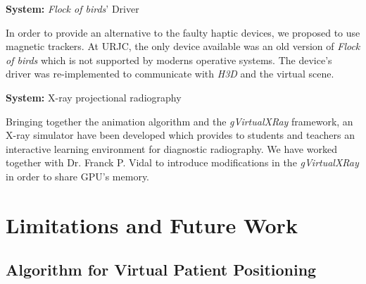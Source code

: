 \textbf{System:} \emph{Flock of birds}' Driver

In order to provide an alternative to the faulty haptic devices, we proposed to use magnetic trackers. At \acs{URJC}, the only device available was an old version of \emph{Flock of birds} which is not supported by moderns operative systems. The device's driver was re-implemented to communicate with \emph{H3D} and the virtual scene.



\textbf{System:} X-ray projectional radiography

Bringing together the animation algorithm and the \emph{gVirtualXRay} framework, an X-ray simulator have been developed which provides to students and teachers an interactive learning environment for diagnostic radiography. We have worked together with Dr. Franck P. Vidal to introduce modifications in the \emph{gVirtualXRay} in order to share \acs{GPU}'s memory.








\section{Limitations and Future Work}
\label{conclu:future}

\subsection{Algorithm for Virtual Patient Positioning}

